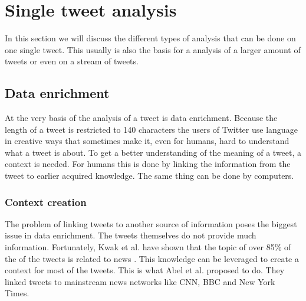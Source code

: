 \documentclass{article}
\begin{document}
\section{Single tweet analysis}
In this section we will discuss the different types of analysis that can be done on one single tweet. This usually is also the basis for a analysis of a larger amount of tweets or even on a stream of tweets. 
\subsection{Data enrichment}
At the very basis of the analysis of a tweet is data enrichment. Because the length of a tweet is restricted to 140 characters the users of Twitter use language in creative ways that sometimes make it, even for humans, hard to understand what a tweet is about. To get a better understanding of the meaning of a tweet, a context is needed. For humans this is done by linking the information from the tweet to earlier acquired knowledge. The same thing can be done by computers. 
\subsubsection{Context creation}
The problem of linking tweets to another source of information poses the biggest issue in data enrichment. The tweets themselves do not provide much information. Fortunately, Kwak et al. have shown that the topic of over 85\% of the of the tweets is related to news \cite{newsmedia}. This knowledge can be leveraged to create a context for most of the tweets.  This is what Abel et al. proposed to do\cite{enrichmentForProfiling}. They linked tweets to mainstream news networks like CNN, BBC and New York Times.
\end{document}
